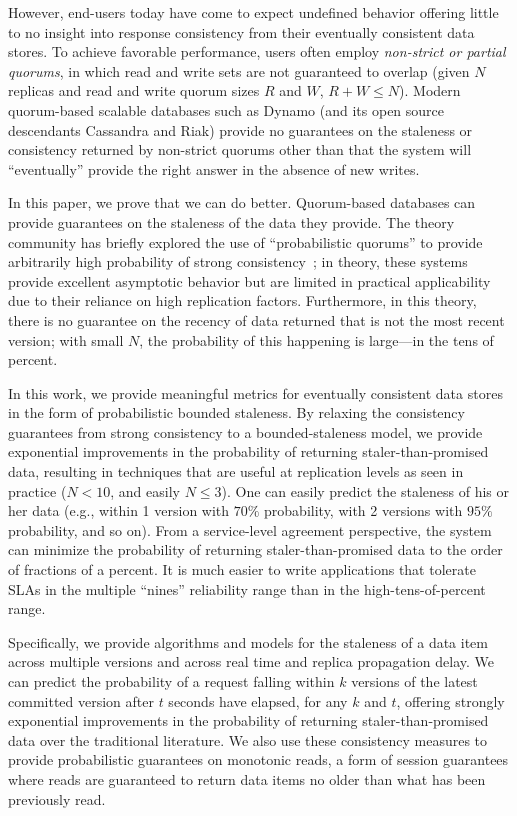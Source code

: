 \documentclass{vldb}
\begin{document}
However, end-users today have come to expect undefined behavior
offering little to no insight into response consistency from their
eventually consistent data stores.  To achieve favorable performance,
users often employ \textit{non-strict or partial quorums}, in which
read and write sets are not guaranteed to overlap (given $N$ replicas
and read and write quorum sizes $R$ and $W$, $R+W \leq N$).  Modern
quorum-based scalable databases such as Dynamo (and its open source
descendants Cassandra and Riak) provide no guarantees on the staleness
or consistency returned by non-strict quorums other than that the
system will ``eventually'' provide the right answer in the absence of
new writes.

In this paper, we prove that we can do better. Quorum-based databases
can provide guarantees on the staleness of the data they provide. The
theory community has briefly explored the use of ``probabilistic
quorums'' to provide arbitrarily high probability of strong
consistency~\cite{prob-quorum}; in theory, these systems provide
excellent asymptotic behavior but are limited in practical
applicability due to their reliance on high replication factors.
Furthermore, in this theory, there is no guarantee on the recency of
data returned that is not the most recent version; with small $N$,
the probability of this happening is large---in the tens of percent.

In this work, we provide meaningful metrics for eventually consistent
data stores in the form of probabilistic bounded staleness.  By
relaxing the consistency guarantees from strong consistency to a
bounded-staleness model, we provide exponential improvements in the
probability of returning staler-than-promised data, resulting in
techniques that are useful at replication levels as seen in practice
($N<10$, and easily $N\leq3$).  One can easily predict the staleness
of his or her data (e.g., within 1 version with $70\%$ probability,
with 2 versions with $95\%$ probability, and so on).  From a
service-level agreement perspective, the system can minimize the
probability of returning staler-than-promised data to the order of
fractions of a percent.  It is much easier to write applications that
tolerate SLAs in the multiple ``nines'' reliability range than in the
high-tens-of-percent range.

Specifically, we provide algorithms and models for the staleness of a
data item across multiple versions and across real time and replica
propagation delay.  We can predict the probability of a request
falling within $k$ versions of the latest committed version after $t$
seconds have elapsed, for any $k$ and $t$, offering strongly
exponential improvements in the probability of returning
staler-than-promised data over the traditional literature.  We also
use these consistency measures to provide probabilistic guarantees on
monotonic reads, a form of session guarantees where reads are
guaranteed to return data items no older than what has been previously
read.
\end{document}
